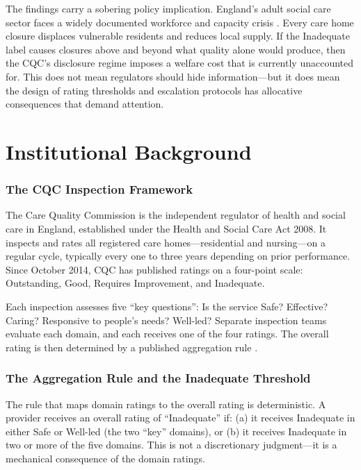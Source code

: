 \documentclass[12pt]{article}
\begin{document}
The findings carry a sobering policy implication. England's adult social care sector faces a widely documented workforce and capacity crisis \citep{skills2023workforce, kingsfund2023social}. Every care home closure displaces vulnerable residents and reduces local supply. If the Inadequate label causes closures above and beyond what quality alone would produce, then the CQC's disclosure regime imposes a welfare cost that is currently unaccounted for. This does not mean regulators should hide information---but it does mean the design of rating thresholds and escalation protocols has allocative consequences that demand attention.

\section{Institutional Background}

\subsubsection*{The CQC Inspection Framework} The Care Quality Commission is the independent regulator of health and social care in England, established under the Health and Social Care Act 2008. It inspects and rates all registered care homes---residential and nursing---on a regular cycle, typically every one to three years depending on prior performance. Since October 2014, CQC has published ratings on a four-point scale: Outstanding, Good, Requires Improvement, and Inadequate.

Each inspection assesses five ``key questions'': Is the service Safe? Effective? Caring? Responsive to people's needs? Well-led? Separate inspection teams evaluate each domain, and each receives one of the four ratings. The overall rating is then determined by a published aggregation rule \citep{cqc2024guidance}.

\subsubsection*{The Aggregation Rule and the Inadequate Threshold} The rule that maps domain ratings to the overall rating is deterministic. A provider receives an overall rating of ``Inadequate'' if: (a) it receives Inadequate in either Safe or Well-led (the two ``key'' domains), or (b) it receives Inadequate in two or more of the five domains. This is not a discretionary judgment---it is a mechanical consequence of the domain ratings.
\end{document}
